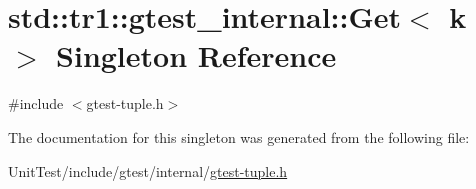 \hypertarget{singletonstd_1_1tr1_1_1gtest__internal_1_1_get}{\section{std\+:\+:tr1\+:\+:gtest\+\_\+internal\+:\+:Get$<$ k $>$ Singleton Reference}
\label{singletonstd_1_1tr1_1_1gtest__internal_1_1_get}
}


{\ttfamily \#include $<$gtest-\/tuple.\+h$>$}



The documentation for this singleton was generated from the following file\+:\begin{DoxyCompactItemize}
\item 
Unit\+Test/include/gtest/internal/\hyperlink{gtest-tuple_8h}{gtest-\/tuple.\+h}\end{DoxyCompactItemize}
